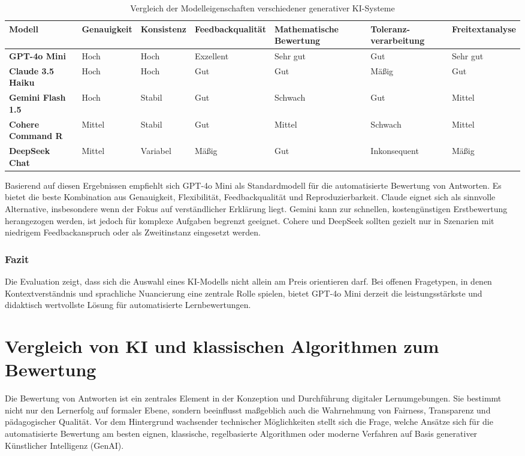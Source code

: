 \documentclass[a4paper,12pt]{article}
\begin{document}
\begin{table}[h!]
\centering
\scriptsize
\renewcommand{\arraystretch}{1.2}
\begin{tabularx}{\textwidth}{>{\bfseries}l p{1.5cm} p{1.4cm} p{2cm} p{1.8cm} p{1.7cm} p{2cm}}
\toprule
Modell & Genauigkeit & Konsistenz & Feedbackqualität & Mathematische Bewertung & Toleranz-verarbeitung & Freitextanalyse \\
\midrule
GPT-4o Mini & Hoch & Hoch & Exzellent & Sehr gut & Gut & Sehr gut \\
Claude 3.5 Haiku & Hoch & Hoch & Gut & Gut & Mäßig & Gut \\
Gemini Flash 1.5 & Hoch & Stabil & Gut & Schwach & Gut & Mittel \\
Cohere Command R & Mittel & Stabil & Gut & Mittel & Schwach & Mittel \\
DeepSeek Chat & Mittel & Variabel & Mäßig & Gut & Inkonsequent & Mäßig \\
\bottomrule
\end{tabularx}
\caption{Vergleich der Modelleigenschaften verschiedener generativer KI-Systeme}
\end{table}

Basierend auf diesen Ergebnissen empfiehlt sich GPT-4o Mini als Standardmodell für die automatisierte Bewertung von Antworten. Es bietet die beste Kombination aus Genauigkeit, Flexibilität, Feedbackqualität und Reproduzierbarkeit. Claude eignet sich als sinnvolle Alternative, insbesondere wenn der Fokus auf verständlicher Erklärung liegt. Gemini kann zur schnellen, kostengünstigen Erstbewertung herangezogen werden, ist jedoch für komplexe Aufgaben begrenzt geeignet. Cohere und DeepSeek sollten gezielt nur in Szenarien mit niedrigem Feedbackanspruch oder als Zweitinstanz eingesetzt werden.

\subsubsection{Fazit}

Die Evaluation zeigt, dass sich die Auswahl eines KI-Modells nicht allein am Preis orientieren darf. Bei offenen Fragetypen, in denen Kontextverständnis und sprachliche Nuancierung eine zentrale Rolle spielen, bietet GPT-4o Mini derzeit die leistungsstärkste und didaktisch wertvollste Lösung für automatisierte Lernbewertungen.

\section{Vergleich von KI und klassischen Algorithmen zum Bewertung}
Die Bewertung von Antworten ist ein zentrales Element in der Konzeption und Durchführung digitaler Lernumgebungen. Sie bestimmt nicht nur den Lernerfolg auf formaler Ebene, sondern beeinflusst maßgeblich auch die Wahrnehmung von Fairness, Transparenz und pädagogischer Qualität. Vor dem Hintergrund wachsender technischer Möglichkeiten stellt sich die Frage, welche Ansätze sich für die automatisierte Bewertung am besten eignen, klassische, regelbasierte Algorithmen oder moderne Verfahren auf Basis generativer Künstlicher Intelligenz (GenAI).
\end{document}
